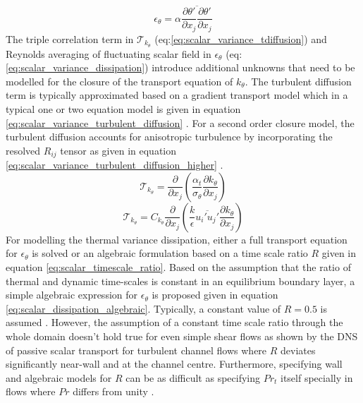 \begin{equation}
\label{eq:scalar_variance_dissipation}
\epsilon_{\theta} = \alpha \overline{\frac{\partial \theta'}{\partial x_{j}}\frac{\partial \theta'}{\partial x_{j}}}
\end{equation}
The triple correlation term in $\mathcal{T}_{k_{\theta}}$ (eq:\ref{eq:scalar_variance_tdiffusion}) and Reynolds averaging of fluctuating scalar field in $\epsilon_{\theta}$ (eq:\ref{eq:scalar_variance_dissipation}) introduce additional unknowns that need to be modelled for the closure of the transport equation of $k_{\theta}$. The turbulent diffusion term is typically approximated based on a gradient transport model which in a typical one or two equation model is given in equation \ref{eq:scalar_variance_turbulent_diffusion} \cite{Launder2001} \cite{Yoder2016}. For a second order closure model, the turbulent diffusion accounts for anisotropic turbulence by incorporating the resolved $R_{ij}$ tensor as given in equation \ref{eq:scalar_variance_turbulent_diffusion_higher} \cite{Leschziner2015}. 
\begin{equation}
\label{eq:scalar_variance_turbulent_diffusion}
\mathcal{T}_{k_{\theta}} = \frac{\partial}{\partial x_{j}}\left(\frac{\alpha_{t}}{\sigma_{\theta}} \frac{\partial k_{\theta}}{\partial x_{j}}\right)
\end{equation}
\begin{equation}
\label{eq:scalar_variance_turbulent_diffusion_higher}
\mathcal{T}_{k_{\theta}} = C_{k_{\theta}}\frac{\partial}{\partial x_{j}}\left(\frac{k}{\epsilon} \overline{u_{i}'u_{j}'} \frac{\partial k_{\theta}}{\partial x_{j}}\right)
\end{equation}
For modelling the thermal variance dissipation, either a full transport equation for $\epsilon_{\theta}$ is solved or an algebraic formulation based on a time scale ratio $R$ given in equation \ref{eq:scalar_timescale_ratio}. Based on the assumption that the ratio of thermal and dynamic time-scales is constant in an equilibrium boundary layer, a simple algebraic expression for $\epsilon_{\theta}$ is proposed given in equation \ref{eq:scalar_dissipation_algebraic}. Typically, a constant value of $R = 0.5$ is assumed \cite{Leschziner2015}. However, the assumption of a constant time scale ratio through the whole domain doesn't hold true for even simple shear flows as shown by the DNS of passive scalar transport for turbulent channel flows \cite{Johansson2000} where $R$ deviates significantly near-wall and at the channel centre. Furthermore, specifying wall and algebraic models for $R$ can be as difficult as specifying $Pr_{t}$ itself specially in flows where $Pr$ differs from unity \cite{Grotzbach2007}. 
